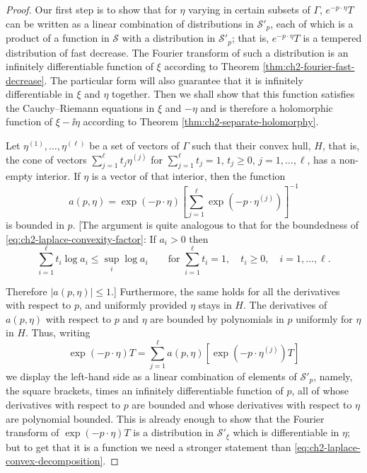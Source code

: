 \begin{proof}
Our first step is to show that for $\eta$ varying in certain subsets of
$\Gamma$, $e^{-p\cdot\eta}T$ can be written as a linear combination of
distributions in $\mathcal{S}'_p$, each of which is a product of a function
in $\mathcal{S}$ with a distribution in $\mathcal{S}'_p$; that is,
$e^{-p\cdot\eta}T$ is a tempered distribution of fast decrease.  The
Fourier transform of such a distribution is an infinitely differentiable
function of $\xi$ according to Theorem \ref{thm:ch2-fourier-fast-decrease}.  The particular form will also
guarantee that it is infinitely differentiable in $\xi$ and $\eta$ together.
Then we shall show that this function satisfies the Cauchy--Riemann
equations in $\xi$ and $-\eta$ and is therefore a holomorphic function of
$\xi-\ii\eta$ according to Theorem \ref{thm:ch2-separate-holomorphy}.

Let $\eta^{(1)},\ldots,\eta^{(\ell)}$ be a set of vectors of $\Gamma$ such
that their convex hull, $H$, that is, the cone of vectors
$\sum_{j=1}^{\ell}t_j\eta^{(j)}$ for $\sum_{j=1}^{\ell}t_j=1$, $t_j\geq0$,
$j=1,\ldots,\ell$, has a non-empty interior.  If $\eta$ is a vector of
that interior, then the function
\begin{equation}
  a(p,\eta)=\exp(-p\cdot\eta)
  \left[\sum_{j=1}^{\ell}\exp(-p\cdot\eta^{(j)})\right]^{-1}
  \tag{2-68}\label{eq:ch2-laplace-convex-combination}
\end{equation}
is bounded in $p$.  [The argument is quite analogous to that for the
boundedness of \eqref{eq:ch2-laplace-convexity-factor}: If $a_i>0$ then
\begin{equation*}
  \sum_{i=1}^{\ell}t_i\log a_i\leq \sup_i\log a_i
  \qquad\text{for }\sum_{i=1}^{\ell}t_i=1,\quad t_i\geq0,
  \quad i=1,\ldots,\ell.
\end{equation*}

Therefore $|a(p,\eta)|\leq1$.]  Furthermore, the same holds for all the
derivatives with respect to $p$, and uniformly provided $\eta$ stays in
$H$.  The derivatives of $a(p,\eta)$ with respect to $p$ and $\eta$ are
bounded by polynomials in $p$ uniformly for $\eta$ in $H$.  Thus, writing
\begin{equation}
  \exp(-p\cdot\eta)T
  =\sum_{j=1}^{\ell}a(p,\eta)
  [\exp(-p\cdot\eta^{(j)})T]
  \tag{2-69}\label{eq:ch2-laplace-convex-decomposition}
\end{equation}
we display the left-hand side as a linear combination of elements of
$\mathcal{S}'_p$, namely, the square brackets, times an infinitely
differentiable function of $p$, all of whose derivatives with respect to
$p$ are bounded and whose derivatives with respect to $\eta$ are polynomial
bounded.  This is already enough to show that the Fourier transform of
$\exp(-p\cdot\eta)T$ is a distribution in $\mathcal{S}'_\xi$ which is
differentiable in $\eta$; but to get that it is a function we need a
stronger statement than \eqref{eq:ch2-laplace-convex-decomposition}.


\end{proof}
